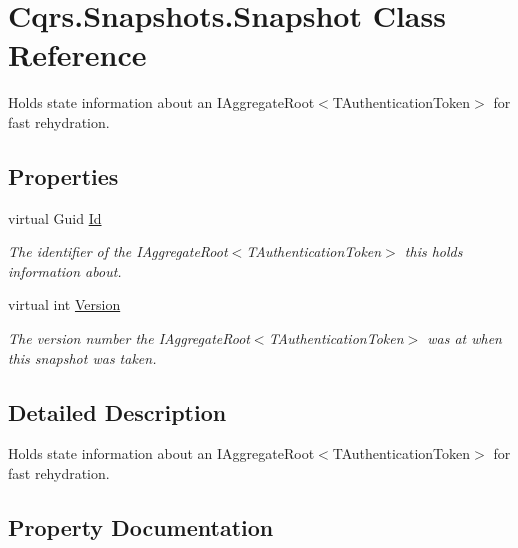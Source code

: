 \hypertarget{classCqrs_1_1Snapshots_1_1Snapshot}{}\section{Cqrs.\+Snapshots.\+Snapshot Class Reference}
\label{classCqrs_1_1Snapshots_1_1Snapshot}


Holds state information about an I\+Aggregate\+Root$<$\+T\+Authentication\+Token$>$ for fast rehydration.  


\subsection*{Properties}
\begin{DoxyCompactItemize}
\item 
virtual Guid \hyperlink{classCqrs_1_1Snapshots_1_1Snapshot_a0da54bdfa43e46a17f6e6aa88d1f3b67_a0da54bdfa43e46a17f6e6aa88d1f3b67}{Id}
\begin{DoxyCompactList}\small\item\em The identifier of the I\+Aggregate\+Root$<$\+T\+Authentication\+Token$>$ this holds information about. \end{DoxyCompactList}\item 
virtual int \hyperlink{classCqrs_1_1Snapshots_1_1Snapshot_a59c0a399430e5f4a1b27d999c3bb5d4f_a59c0a399430e5f4a1b27d999c3bb5d4f}{Version}
\begin{DoxyCompactList}\small\item\em The version number the I\+Aggregate\+Root$<$\+T\+Authentication\+Token$>$ was at when this snapshot was taken. \end{DoxyCompactList}\end{DoxyCompactItemize}


\subsection{Detailed Description}
Holds state information about an I\+Aggregate\+Root$<$\+T\+Authentication\+Token$>$ for fast rehydration. 



\subsection{Property Documentation}
\mbox{\label{classCqrs_1_1Snapshots_1_1Snapshot_a0da54bdfa43e46a17f6e6aa88d1f3b67_a0da54bdfa43e46a17f6e6aa88d1f3b67}} 
